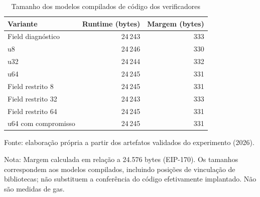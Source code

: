 \begin{table}[htbp]
\centering
\caption{Tamanho dos modelos compilados de código dos verificadores}
\label{tab:verificadores}
\begin{tabular}{lrr}
\hline
Variante & Runtime (bytes) & Margem (bytes) \\
\hline
Field diagnóstico & 24\,243 & 333 \\
u8 & 24\,246 & 330 \\
u32 & 24\,244 & 332 \\
u64 & 24\,245 & 331 \\
Field restrito 8 & 24\,245 & 331 \\
Field restrito 32 & 24\,243 & 333 \\
Field restrito 64 & 24\,245 & 331 \\
u64 com compromisso & 24\,245 & 331 \\
\hline
\end{tabular}
\par\smallskip
\begin{minipage}{\textwidth}
\renewcommand{\baselinestretch}{1}\small
Fonte: elaboração própria a partir dos artefatos validados do experimento (2026).\par
Nota: Margem calculada em relação a 24.576 bytes (EIP-170). Os tamanhos correspondem aos modelos compilados, incluindo posições de vinculação de bibliotecas; não substituem a conferência do código efetivamente implantado. Não são medidas de gas.
\end{minipage}
\end{table}
